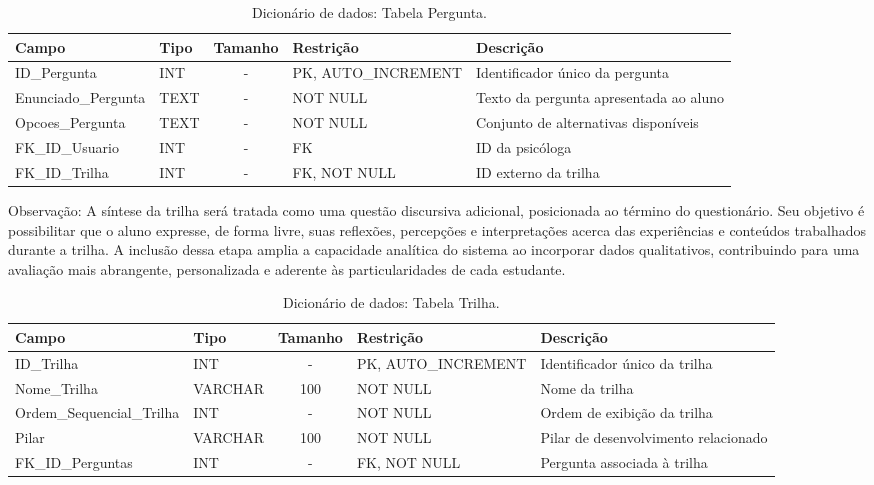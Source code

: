 \begin{table}[H]
    \centering
    \ABNTEXfontereduzida
    \caption[Dicionário de Dados - Tabela Pergunta]{Dicionário de dados: Tabela Pergunta.}
    \label{tab-tb-pergunta}
    \begin{tabular}{p{3.5cm}|p{2cm}|c|p{3.5cm}|p{4cm}}
    \textbf{Campo} & \textbf{Tipo} & \textbf{Tamanho} & \textbf{Restrição} & \textbf{Descrição} \\
    \hline
    ID\_Pergunta & INT & - & PK, AUTO\_INCREMENT & Identificador único da pergunta \\
    \hline
    Enunciado\_Pergunta & TEXT & - & NOT NULL & Texto da pergunta apresentada ao aluno \\
    \hline
    Opcoes\_Pergunta & TEXT & - & NOT NULL & Conjunto de alternativas disponíveis \\
    \hline
    FK\_ID\_Usuario & INT & - & FK & ID da psicóloga \\
    \hline
    FK\_ID\_Trilha & INT & - & FK, NOT NULL & ID externo da trilha \\
    \end{tabular}
\end{table}

Observação: A síntese da trilha será tratada como uma questão discursiva adicional, posicionada ao término do questionário. Seu objetivo é possibilitar que o aluno expresse, de forma livre, suas reflexões, percepções e interpretações acerca das experiências e conteúdos trabalhados durante a trilha. A inclusão dessa etapa amplia a capacidade analítica do sistema ao incorporar dados qualitativos, contribuindo para uma avaliação mais abrangente, personalizada e aderente às particularidades de cada estudante.

\begin{table}[H]
    \centering
    \ABNTEXfontereduzida
    \caption[Dicionário de Dados - Tabela Trilha]{Dicionário de dados: Tabela Trilha.}
    \label{tab-tb-trilha}
    \begin{tabular}{p{3.5cm}|p{2cm}|c|p{3.5cm}|p{4cm}}
    \textbf{Campo} & \textbf{Tipo} & \textbf{Tamanho} & \textbf{Restrição} & \textbf{Descrição} \\
    \hline
    ID\_Trilha & INT & - & PK, AUTO\_INCREMENT & Identificador único da trilha \\
    \hline
    Nome\_Trilha & VARCHAR & 100 & NOT NULL & Nome da trilha \\
    \hline
    Ordem\_Sequencial\_Trilha & INT & - & NOT NULL & Ordem de exibição da trilha \\
    \hline
    Pilar & VARCHAR & 100 & NOT NULL & Pilar de desenvolvimento relacionado \\
    \hline
    FK\_ID\_Perguntas & INT & - & FK, NOT NULL & Pergunta associada à trilha \\
    \end{tabular}
\end{table}

